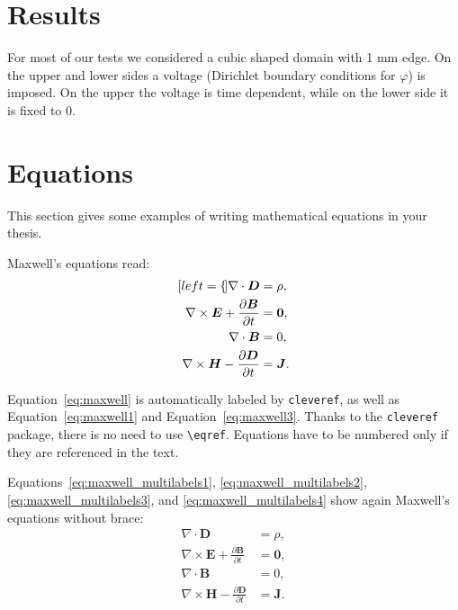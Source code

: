 \documentclass[11pt,a4paper]{article}
\begin{document}
\section{Results}
For most of our tests we considered a cubic shaped domain with 1 mm edge. On the upper and lower sides a voltage (Dirichlet boundary conditions for \(\varphi\)) is imposed. On the upper the voltage is time dependent, while on the lower side it is fixed to 0.
\section{Equations}
\label{sec:eqs}
This section gives some examples of writing mathematical equations in your thesis.

Maxwell's equations read:
\begin{subequations}
    \label{eq:maxwell}
    \begin{align}[left=\empheqlbrace]
    \nabla\cdot \bm{D} & = \rho, \label{eq:maxwell1} \\
    \nabla \times \bm{E} +  \frac{\partial \bm{B}}{\partial t} & = \bm{0}, \label{eq:maxwell2} \\
    \nabla\cdot \bm{B} & = 0, \label{eq:maxwell3} \\
    \nabla \times \bm{H} - \frac{\partial \bm{D}}{\partial t} &= \bm{J}. \label{eq:maxwell4}
    \end{align}
\end{subequations}

Equation~\eqref{eq:maxwell} is automatically labeled by \texttt{cleveref},
as well as Equation~\eqref{eq:maxwell1} and Equation~\eqref{eq:maxwell3}.
Thanks to the \verb|cleveref| package, there is no need to use \verb|\eqref|.
Equations have to be numbered only if they are referenced in the text.

Equations~\eqref{eq:maxwell_multilabels1}, \eqref{eq:maxwell_multilabels2}, \eqref{eq:maxwell_multilabels3}, and \eqref{eq:maxwell_multilabels4} show again Maxwell's equations without brace:
\begin{align}
    \nabla\cdot \bm{D} & = \rho, \label{eq:maxwell_multilabels1} \\
    \nabla \times \bm{E} +  \frac{\partial \bm{B}}{\partial t} &= \bm{0}, \label{eq:maxwell_multilabels2} \\
    \nabla\cdot \bm{B} & = 0, \label{eq:maxwell_multilabels3} \\
    \nabla \times \bm{H} - \frac{\partial \bm{D}}{\partial t} &= \bm{J} \label{eq:maxwell_multilabels4}.
\end{align}
\end{document}
